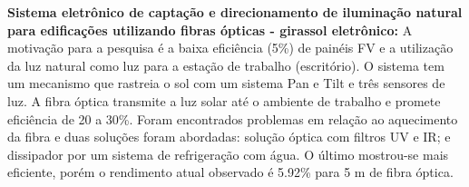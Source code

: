 \textbf{Sistema eletrônico de captação e direcionamento de iluminação natural
para edificações utilizando fibras ópticas - girassol eletrônico:}
A motivação para a pesquisa é a baixa eficiência (5\%) de painéis FV e a
utilização da luz natural como luz para a estação de trabalho (escritório). O
sistema tem um mecanismo que rastreia o sol com um sistema Pan e Tilt e três
sensores de luz. A fibra óptica transmite a luz solar até o ambiente de trabalho
e promete eficiência de 20 a 30\%. Foram encontrados problemas em relação ao
aquecimento da fibra e duas soluções foram abordadas: solução óptica com filtros
UV e IR; e dissipador por um sistema de refrigeração com água. O último
mostrou-se mais eficiente, porém o rendimento atual observado é 5.92\% para 5 m
de fibra óptica.
